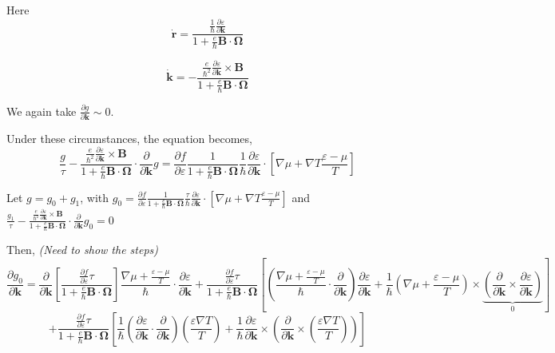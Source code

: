 \documentclass{revtex4-2}
\newcommand{\bvec}[1]{{\mathbf #1}}
\begin{document}
Here \begin{equation}
\dot{\bvec{r}} = \frac{\frac{1}{\hbar} \frac{\partial \varepsilon}{\partial \bvec{k}}}{1 + \frac{e}{\hbar} \bvec{B}\cdot\bvec{\Omega}}
\end{equation}

\begin{equation}
\dot{\bvec{k}} = -\frac{\frac{e}{\hbar^2} \frac{\partial \varepsilon}{\partial \bvec{k}} \times \bvec{B}}{1 + \frac{e}{\hbar} \bvec{B}\cdot\bvec{\Omega}}
\end{equation}

We again take $\frac{\partial g}{\partial \bvec{k}} \sim 0$.

Under these circumstances, the equation becomes,
$$
\frac{g}{\tau} -\frac{\frac{e}{\hbar^2} \frac{\partial \varepsilon}{\partial \bvec{k}} \times \bvec{B}}{1 + \frac{e}{\hbar} \bvec{B}\cdot\bvec{\Omega}} \cdot\frac{\partial}{\partial \bvec{k}} g = \frac{\partial f}{\partial \varepsilon}\frac{1}{1 + \frac{e}{\hbar} \bvec{B}\cdot\bvec{\Omega}}
\frac{1}{\hbar} \frac{\partial \varepsilon}{\partial \bvec{k}}\cdot\left[ \nabla{\mu} + \nabla T \frac{\varepsilon - \mu}{T}\right] $$

Let $g = g_0 + g_1$, with $g_0 = \frac{\partial f}{\partial \varepsilon}\frac{1}{1 + \frac{e}{\hbar} \bvec{B}\cdot\bvec{\Omega}}
\frac{\tau}{\hbar} \frac{\partial \varepsilon}{\partial \bvec{k}}\cdot\left[ \nabla{\mu} + \nabla T \frac{\varepsilon - \mu}{T}\right]$ and $\frac{g_1}{\tau} -\frac{\frac{e}{\hbar^2} \frac{\partial \varepsilon}{\partial \bvec{k}} \times \bvec{B}}{1 + \frac{e}{\hbar} \bvec{B}\cdot\bvec{\Omega}} \cdot\frac{\partial}{\partial \bvec{k}} g_0 = 0$

Then, \textit{(Need to show the steps)}
$$\frac{\partial g_0}{\partial \bvec{k}} = 
\frac{\partial}{\partial \bvec{k}} \left[ \frac{\frac{\partial f} {\partial \varepsilon} \tau}{1 + \frac{e}{\hbar} \bvec{B}\cdot\bvec{\Omega}}
\right] \frac{\nabla \mu + \frac{\varepsilon - \mu}{T}}{\hbar} \cdot \frac{\partial \varepsilon}{\partial \bvec{k}} + \frac{\frac{\partial f} {\partial \varepsilon} \tau}{1 + \frac{e}{\hbar} \bvec{B}\cdot\bvec{\Omega}} \left[(\frac{\nabla \mu + \frac{\varepsilon - \mu}{T}}{\hbar} \cdot \frac{\partial }{\partial \bvec{k}} )\frac{\partial \varepsilon}{\partial \bvec{k}} + \frac{1}{\hbar} (\nabla \mu + \frac{\varepsilon - \mu}{T})\times \underbrace{(\frac{\partial }{\partial \bvec{k}} \times \frac{\partial \varepsilon}{\partial \bvec{k}})}_0 \right]
$$
$$+ \frac{\frac{\partial f} {\partial \varepsilon} \tau}{1 + \frac{e}{\hbar} \bvec{B}\cdot\bvec{\Omega}} \left[\frac{1}{\hbar} (\frac{\partial \varepsilon}{\partial \bvec{k}} \cdot \frac{\partial }{\partial \bvec{k}}) (\frac{\varepsilon \nabla T}{T}) + \frac{1}{\hbar} \frac{\partial \varepsilon}{\partial \bvec{k}} \times \left(  \frac{\partial }{\partial \bvec{k}} \times \left(\frac{\varepsilon \nabla T}{T}\right) \right) \right]$$
\end{document}
